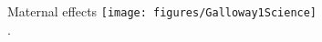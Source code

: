 \documentclass[10pt]{beamer}
\begin{document}
%


\begin{frame}{Maternal effects}
    \centering
    \texttt{[image: figures/Galloway1Science]}\\
    {\small \autocite[from][]{Galloway2007}.}
\end{frame}
\end{document}
